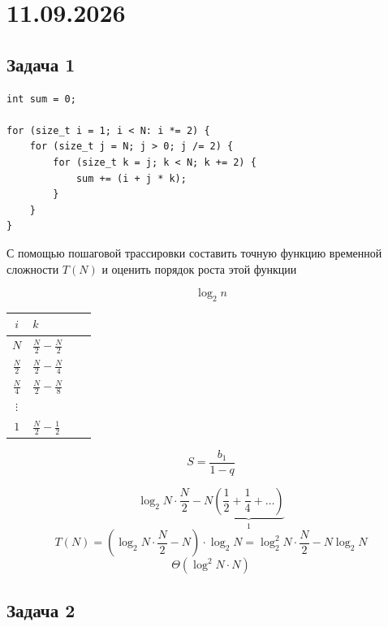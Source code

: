\section{11.09.2026} 

\subsection{Задача 1}

\begin{exercise}
\begin{lstlisting}
int sum = 0;

for (size_t i = 1; i < N: i *= 2) {
    for (size_t j = N; j > 0; j /= 2) {
        for (size_t k = j; k < N; k += 2) {
            sum += (i + j * k);
        }
    }
}

\end{lstlisting}

С помощью пошаговой трассировки составить точную функцию временной сложности $T(N)$ и оценить порядок роста этой функции
\end{exercise}

\begin{solution}
    \[
        \log_2 n
    \]
\begin{center}
\begin{tabular}{Sl|Sl}
$i$ & $k$\\
\hline
$N$   & $\frac{N}{2} - \frac{N}{2}$ \\
\hline
$\frac{N}{2}$   & $\frac{N}{2} - \frac{N}{4}$ \\
\hline
$\frac{N}{4}$   & $\frac{N}{2} - \frac{N}{8}$ \\
\hline
$\vdots$ & \\
\hline
$1$   & $\frac{N}{2} - \frac{1}{2}$ \\
\hline
\end{tabular}
\end{center}

\[
    S = \frac{b_1}{1-q}
\]

\[
    \log_2 N \cdot \frac{N}{2} - N \underbrace{\left( \frac{1}{2} + \frac{1}{4} + \ldots \right)}_{1}
\]
\[
    T(N) = \left( \log _2 N\cdot \frac{N}{2} - N \right) \cdot \log _2 N = \log _2^2 N \cdot \frac{N}{2} - N\log _2 N
\]
\[
    \Theta(\log ^2 N \cdot N)
\]

\end{solution}

\subsection{Задача 2}


